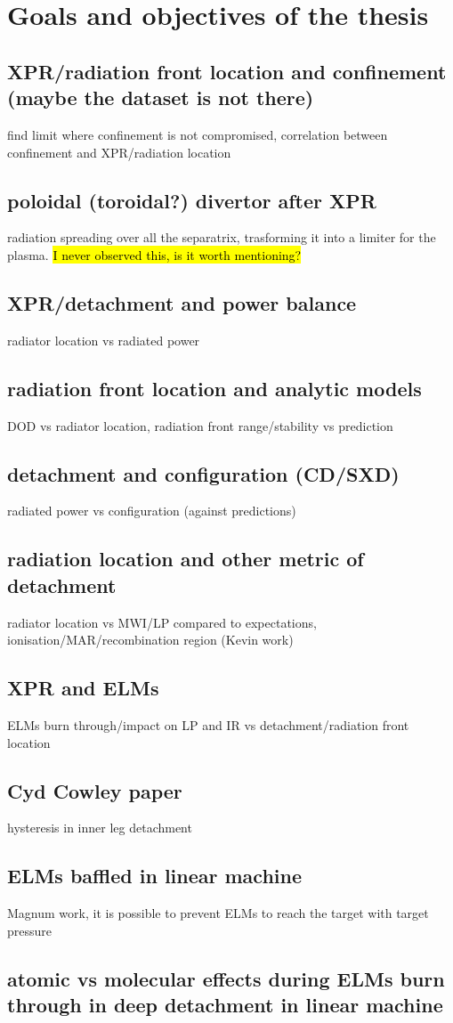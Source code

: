 \section{Goals and objectives of the thesis}

\subsection{XPR/radiation front location and confinement (maybe the dataset is not there)}
find limit where confinement is not compromised, correlation between confinement and XPR/radiation location
\subsection{poloidal (toroidal?) divertor after XPR}
radiation spreading over all the separatrix, trasforming it into a limiter for the plasma.
\hl{I never observed this, is it worth mentioning?}
\subsection{XPR/detachment and power balance}
radiator location vs radiated power
\subsection{radiation front location and analytic models}
DOD vs radiator location, radiation front range/stability vs prediction
\subsection{detachment and configuration (CD/SXD)}
radiated power vs configuration (against predictions)
\subsection{radiation location and other metric of detachment}
radiator location vs MWI/LP compared to expectations, ionisation/MAR/recombination region (Kevin work)
\subsection{XPR and ELMs}
ELMs burn through/impact on LP and IR vs detachment/radiation front location
\subsection{Cyd Cowley paper}
hysteresis in inner leg detachment
\subsection{ELMs baffled in linear machine}
Magnum work, it is possible to prevent ELMs to reach the target with target pressure
\subsection{atomic vs molecular effects during ELMs burn through in deep detachment in linear machine}






